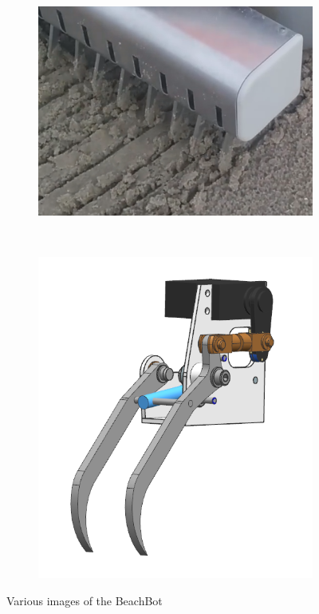 \begin{figure}
\begin{subfigure}[c]{0.46\textwidth}
\includegraphics[width=\textwidth]{images/introduction/localization_precision.png} 
\end{subfigure}
~
\begin{subfigure}[c]{0.46\textwidth}
\includegraphics[width=\textwidth]{images/introduction/rake_pins.png}
\end{subfigure}
\caption{Various images of the BeachBot}
\end{figure} 
